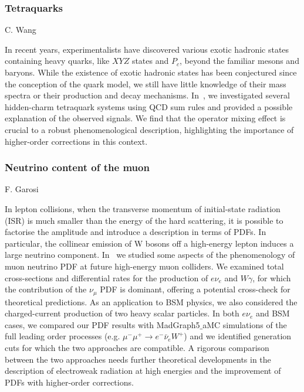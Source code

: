 \documentclass{FBR_Bericht_2025}
\begin{document}
\begin{refsection}
\subsubsection{Tetraquarks}
\begin{Namen}
C. Wang
\end{Namen}
%
In recent years, experimentalists have discovered various exotic hadronic states containing heavy quarks, like $X Y Z$ states and $P_{c}$, beyond the familiar mesons and baryons.
While the existence of exotic hadronic states has been conjectured since the conception of the quark model, we still have little knowledge of their mass spectra or their production and decay mechanisms.
In~\cite{Wu:2023ntn}, we investigated several hidden-charm tetraquark systems using QCD sum rules and provided a possible explanation of the observed signals.
We find that the operator mixing effect is crucial to a robust phenomenological description, highlighting the importance of higher-order corrections in this context.
%
\subsubsection{Neutrino content of the muon}
\begin{Namen}
F. Garosi
\end{Namen}
In lepton collisions, when the transverse momentum of initial-state radiation (ISR) is much smaller than the energy of the hard scattering, it is possible to factorise the amplitude and introduce a description in terms of PDFs. In particular, the collinear emission of W bosons off a high-energy lepton induces a large neutrino component. In~ we studied some aspects of the phenomenology of muon neutrino PDF at future high-energy muon colliders. We examined total cross-sections and differential rates for the production of $e\nu_e$ and $W\gamma$, for which the contribution of the $\nu_\mu$ PDF is dominant, offering a potential cross-check for theoretical predictions. As an application to BSM physics, we also considered the charged-current production of two heavy scalar particles. In both $e\nu_e$ and BSM cases, we compared our PDF results with MadGraph5$\_$aMC simulations of the full leading order processes (e.g. $\mu^-\mu^+\to e^-\bar{\nu}_eW^+$) and we identified generation cuts for which the two approaches are compatible. A rigorous comparison between the two approaches needs further theoretical developments in the description of electroweak radiation at high energies and the improvement of PDFs with higher-order corrections.
%
\printbibliography[heading=subbibliography]
\end{refsection}
\end{document}

